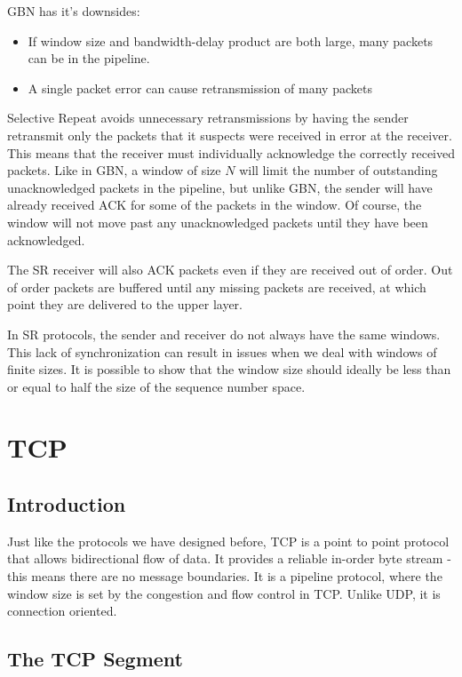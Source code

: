 \documentclass[12pt,letterpaper]{book}
\theoremstyle{definition}
\begin{document}
GBN has it's downsides:

\begin{itemize}
  \item If window size and bandwidth-delay product are both large, many packets can be in the pipeline.
  \item A single packet error can cause retransmission of many packets
\end{itemize}

Selective Repeat avoids unnecessary retransmissions by having the sender retransmit only the packets that it suspects were received in error at the receiver. This means that the receiver must individually acknowledge the correctly received packets. Like in GBN, a window of size $N$ will limit the number of outstanding unacknowledged packets in the pipeline, but unlike GBN, the sender will have already received ACK for some of the packets in the window. Of course, the window will not move past any unacknowledged packets until they have been acknowledged.

The SR receiver will also ACK packets even if they are received out of order. Out of order packets are buffered until any missing packets are received, at which point they are delivered to the upper layer.

In SR protocols, the sender and receiver do not always have the same windows. This lack of synchronization can result in issues when we deal with windows of finite sizes. It is possible to show that the window size should ideally be less than or equal to half the size of the sequence number space.

\section{TCP}

\subsection{Introduction}

Just like the protocols we have designed before, TCP is a point to point protocol that allows bidirectional flow of data. It provides a reliable in-order byte stream - this means there are no message boundaries. It is a pipeline protocol, where the window size is set by the congestion and flow control in TCP. Unlike UDP, it is connection oriented.

\subsection{The TCP Segment}
\end{document}
